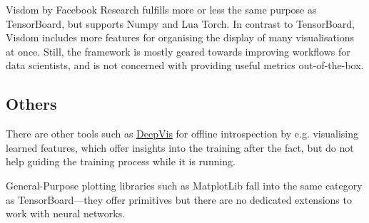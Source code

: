 Visdom by Facebook Research fulfills more or less the same purpose as
TensorBoard, but supports Numpy and Lua Torch. In contrast to
TensorBoard, Visdom includes more features for organising the display of
many visualisations at once. Still, the framework is mostly geared
towards improving workflows for data scientists, and is not concerned
with providing useful metrics out-of-the-box.

\hypertarget{others}{%
\subsection*{Others}\label{others}}

There are other tools such as \href{http://yosinski.com/deepvis}{DeepVis} for
offline introspection by e.g.  visualising learned features, which offer
insights into the training after the fact, but do not help guiding the training
process while it is running.

General-Purpose plotting libraries such as MatplotLib fall into the same
category as TensorBoard---they offer primitives but there are no dedicated
extensions to work with neural networks.
